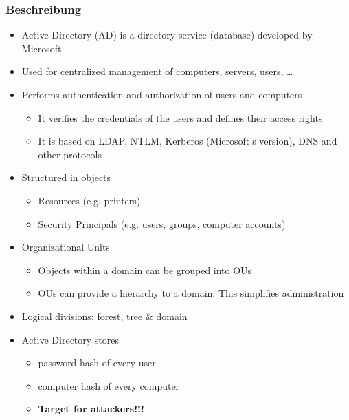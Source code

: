 \subsubsection{Beschreibung}
\begin{itemize}
    \item Active Directory (AD) is a directory service (database) developed by Microsoft
    \item Used for centralized management of computers, servers, users, …
    \item Performs authentication and authorization of users and computers
    \begin{itemize}
        \item It verifies the credentials of the users and defines their access rights
        \item It is based on LDAP, NTLM, Kerberos (Microsoft's version), DNS and other protocols
    \end{itemize}
    \item Structured in objects
    \begin{itemize}
        \item Resources (e.g. printers)
        \item Security Principals (e.g. users, groups, computer accounts)
    \end{itemize}
    \item Organizational Units
    \begin{itemize}
        \item Objects within a domain can be grouped into OUs
        \item OUs can provide a hierarchy to a domain. This simplifies administration
    \end{itemize}
    \item Logical divisions: forest, tree \& domain
    \item Active Directory stores
    \begin{itemize}
        \item password hash of every user
        \item computer hash of every computer
        \color{red}
        \item \textbf{Target for attackers!!!}
    \end{itemize}
\end{itemize}

